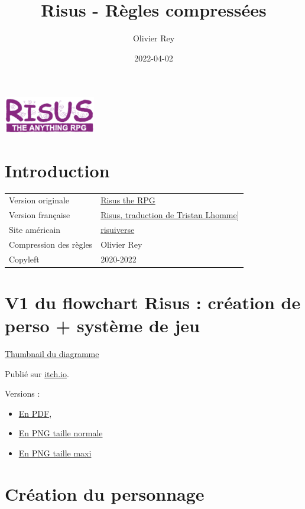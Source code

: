 \documentclass[a4paper, 11pt, twocolumn, twoside]{article}
\author{Olivier Rey}
\date{2022-04-02}
\title{Risus - Règles compressées}
\begin{document}
\maketitle
\tableofcontents

\newpage

\begin{center}
\includegraphics[width=4cm]{logo-risus.png}
\end{center}

\section{Introduction}
\label{sec:org85e33ac}

\begin{longtable}{ll}
Version originale & \href{https://www.drivethrurpg.com/product/170294/Risus-The-Anything-RPG}{Risus the RPG}\\
Version française & \href{risus-fr.pdf}{Risus, traduction de Tristan Lhomme}]\\
Site américain & \href{http://www.risusiverse.com/}{risuiverse}\\
Compression des règles & Olivier Rey\\
Copyleft & 2020-2022\\
\end{longtable}


\section{V1 du flowchart Risus : création de perso + système de jeu}
\label{sec:org051a47f}

\href{thumbnail-risus-flowchart.png}{Thumbnail du diagramme}

Publié sur \href{https://rouboudou.itch.io/risus-flowchart}{itch.io}.

Versions :

\begin{itemize}
\item \href{risus-flowchart.pdf}{En PDF},
\item \href{risus-flowchart.png}{En PNG taille normale}
\item \href{risus-flowchart-big.png}{En PNG taille maxi}
\end{itemize}

\section{Création du personnage}
\label{sec:orga17e3f3}
\end{document}
